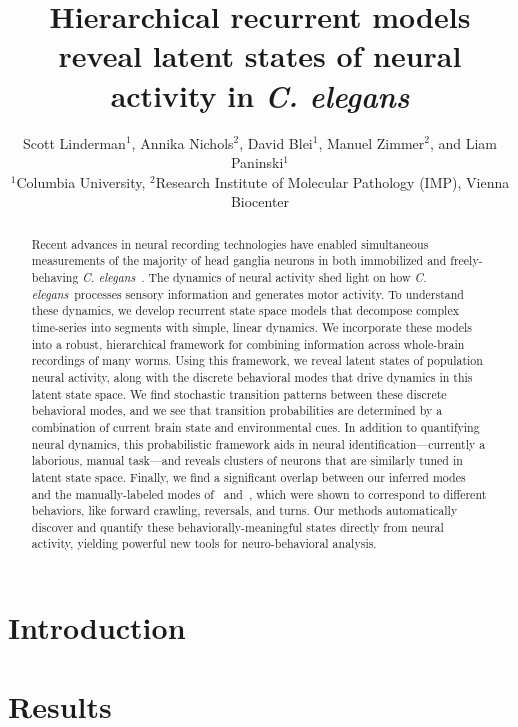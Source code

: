 \documentclass{article}
\title{Hierarchical recurrent models reveal latent states of neural activity in \textit{C. elegans}}
\author{Scott Linderman$^{\text{1}}$,
  Annika Nichols$^{\text{2}}$,
  David Blei$^{\text{1}}$,
  Manuel Zimmer$^{\text{2}}$,
  and
  Liam Paninski$^{\text{1}}$
  \\
  $^{\text{1}}$Columbia University,
  $^{\text{2}}$Research Institute of Molecular Pathology (IMP), Vienna Biocenter
}
\newcommand{\celegans}{\textit{C. elegans}}
\begin{document}
\doublespacing

\maketitle

\begin{abstract}
  Recent advances in neural recording technologies have enabled
  simultaneous measurements of the majority of head ganglia neurons in
  both immobilized and freely-behaving
  \celegans~\citep{schrodel2013brain, prevedel2014simultaneous,
    nguyen2016whole}.  The dynamics of neural activity shed light on
  how \celegans~processes sensory information and generates motor
  activity.  To understand these dynamics, we develop recurrent state
  space models that decompose complex time-series into segments with
  simple, linear dynamics. We incorporate these models into a robust,
  hierarchical framework for combining information across whole-brain
  recordings of many worms.  Using this framework, we reveal latent
  states of population neural activity, along with the discrete
  behavioral modes that drive dynamics in this latent state space.  We
  find stochastic transition patterns between these discrete
  behavioral modes, and we see that transition probabilities are
  determined by a combination of current brain state and environmental
  cues.  In addition to quantifying neural dynamics, this
  probabilistic framework aids in neural identification---currently a
  laborious, manual task---and reveals clusters of neurons that are
  similarly tuned in latent state space.  Finally, we find a
  significant overlap between our inferred modes and the
  manually-labeled modes of~\citet{kato2015global}
  and~\citet{nichols2017global}, which were shown to correspond to
  different behaviors, like forward crawling, reversals, and
  turns. Our methods automatically discover and quantify these
  behaviorally-meaningful states directly from neural activity,
  yielding powerful new tools for neuro-behavioral analysis.
\end{abstract}

\clearpage

\section*{Introduction}

\clearpage

\section*{Results}
\end{document}
